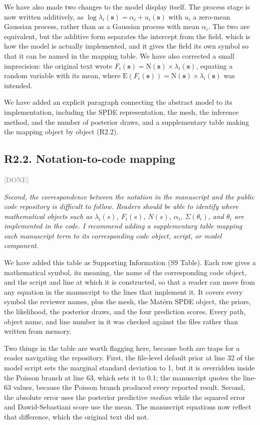 \documentclass[11pt]{article}
\newcommand{\N}{\mbox{N}}
\newcommand{\E}{\mbox{E}}
\newcommand{\status}[1]{\textcolor{gray}{\small\textsf{[#1]}}}
\newenvironment{rev}{\begin{leftbar}\itshape\small}{\end{leftbar}}
\begin{document}
We have also made two changes to the model display itself. The process stage is now written
additively, as $\log\lambda_i(\mathbf{s}) = \alpha_i + u_i(\mathbf{s})$ with $u_i$ a zero-mean Gaussian
process, rather than as a Gaussian process with mean $\alpha_i$. The two are equivalent, but
the additive form separates the intercept from the field, which is how the model is actually
implemented, and it gives the field its own symbol so that it can be named in the mapping
table. We have also corrected a small imprecision: the original text wrote
$F_i(\mathbf{s}) = \N(\mathbf{s})\times\lambda_i(\mathbf{s})$, equating a random variable with its mean, where
$\E(F_i(\mathbf{s})) = \N(\mathbf{s})\times\lambda_i(\mathbf{s})$ was intended.

We have added an explicit paragraph connecting the abstract model to its implementation,
including the SPDE representation, the mesh, the inference method, and the number of
posterior draws, and a supplementary table making the mapping object by object (R2.2).

\subsection{R2.2. Notation-to-code mapping} \status{DONE}

\begin{rev}
Second, the correspondence between the notation in the manuscript and the public code
repository is difficult to follow. Readers should be able to identify where mathematical
objects such as $\lambda_i(s)$, $F_i(s)$, $N(s)$, $\alpha_i$, $\Sigma(\theta_i)$, and
$\theta_i$ are implemented in the code. I recommend adding a supplementary table mapping
each manuscript term to its corresponding code object, script, or model component.
\end{rev}

\noindent We have added this table as Supporting Information (S9 Table). Each row gives a
mathematical symbol, its meaning, the name of the corresponding code object, and the script
and line at which it is constructed, so that a reader can move from any equation in the
manuscript to the lines that implement it. It covers every symbol the reviewer names, plus
the mesh, the Mat\'ern SPDE object, the priors, the likelihood, the posterior draws, and the
four prediction scores. Every path, object name, and line number in it was checked against
the files rather than written from memory.

Two things in the table are worth flagging here, because both are traps for a reader
navigating the repository. First, the file-level default prior at line 32 of the model
script sets the marginal standard deviation to 1, but it is overridden inside the Poisson
branch at line 63, which sets it to 0.1; the manuscript quotes the line-63 values, because
the Poisson branch produced every reported result. Second, the absolute error uses the
posterior predictive \emph{median} while the squared error and Dawid-Sebastiani score use
the mean. The manuscript equations now reflect that difference, which the original text did
not.
\end{document}
